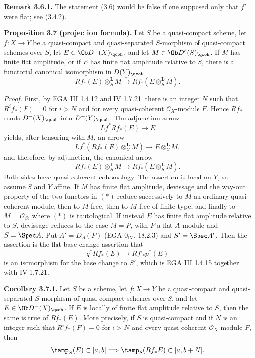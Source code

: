 \textbf{Remark 3.6.1.} The statement (3.6) would be false if one supposed only that \(f'\) were flat; see (3.4.2).

\textbf{Proposition 3.7 (projection formula).} Let \(S\) be a quasi-compact scheme, let \(f:X\to Y\) be a quasi-compact and quasi-separated \(S\)-morphism of quasi-compact schemes over \(S\), let \(E\in\Ob D^{-}(X)_{\qcoh}\), and let \(M\in\Ob D^b(S)_{\qcoh}\). If \(M\) has finite flat amplitude, or if \(E\) has finite flat amplitude relative to \(S\), there is a functorial canonical isomorphism in \(D(Y)_{\qcoh}\)
\[
 Rf_*(E)\otimes_S^{\mathbf L}M
 \xrightarrow{\sim}
 Rf_*(E\otimes_S^{\mathbf L}M).
\]

\emph{Proof.} First, by EGA III 1.4.12 and IV 1.7.21, there is an integer \(N\) such that \(R^if_*(F)=0\) for \(i>N\) and for every quasi-coherent \(\mathcal O_X\)-module \(F\). Hence \(Rf_*\) sends \(D^{-}(X)_{\qcoh}\) into \(D^{-}(Y)_{\qcoh}\). The adjunction arrow
\[
 Lf^*Rf_*(E)\longrightarrow E
\]
yields, after tensoring with \(M\), an arrow
\[
 Lf^*(Rf_*(E)\otimes_S^{\mathbf L}M)
 \longrightarrow E\otimes_S^{\mathbf L}M,
\]
and therefore, by adjunction, the canonical arrow
\[
 Rf_*(E)\otimes_S^{\mathbf L}M
 \longrightarrow Rf_*(E\otimes_S^{\mathbf L}M).\tag{*}
\]
Both sides have quasi-coherent cohomology. The assertion is local on \(Y\), so assume \(S\) and \(Y\) affine. If \(M\) has finite flat amplitude, devissage and the way-out property of the two functors in \((*)\) reduce successively to \(M\) an ordinary quasi-coherent module, then to \(M\) free, then to \(M\) free of finite type, and finally to \(M=\mathcal O_S\), where \((*)\) is tautological. If instead \(E\) has finite flat amplitude relative to \(S\), devissage reduces to the case \(M=P\), with \(P\) a flat \(A\)-module and \(S=\Spec A\). Put \(A'=D_A(P)\) (EGA \(0_{\mathrm{IV}}\), 18.2.3) and \(S'=\Spec A'\). Then the assertion is the flat base-change assertion that
\[
 q^*Rf_*(E)\longrightarrow Rf'_*p^*(E)
\]
is an isomorphism for the base change to \(S'\), which is EGA III 1.4.15 together with IV 1.7.21.

\textbf{Corollary 3.7.1.} Let \(S\) be a scheme, let \(f:X\to Y\) be a quasi-compact and quasi-separated \(S\)-morphism of quasi-compact schemes over \(S\), and let \(E\in\Ob D^{-}(X)_{\qcoh}\). If \(E\) is locally of finite flat amplitude relative to \(S\), then the same is true of \(Rf_*(E)\). More precisely, if \(S\) is quasi-compact and if \(N\) is an integer such that \(R^if_*(F)=0\) for \(i>N\) and every quasi-coherent \(\mathcal O_X\)-module \(F\), then
\[
 \tamp_S(E)\subset[a,b]
 \Longrightarrow
 \tamp_S(Rf_*E)\subset[a,b+N].
\]

